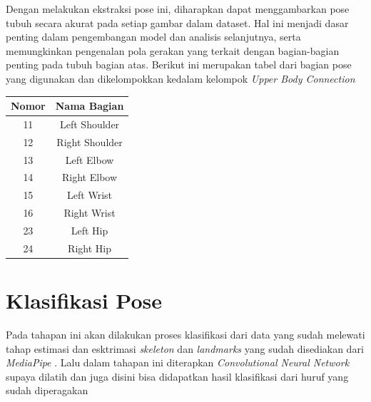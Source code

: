 Dengan melakukan ekstraksi pose ini, diharapkan dapat menggambarkan pose tubuh secara akurat pada setiap gambar dalam dataset. Hal ini menjadi dasar penting dalam pengembangan model dan analisis selanjutnya, serta memungkinkan pengenalan pola gerakan yang terkait dengan bagian-bagian penting pada tubuh bagian atas. Berikut ini merupakan tabel dari bagian pose yang digunakan dan dikelompokkan kedalam kelompok \textit{Upper Body Connection}
\begin{center}
	\begin{table}[hbt!]
		\label{tbl:PoseLandmarks}
		\centering
		\begin{tabular}{cc}
			\hline
			Nomor & Nama Bagian \\
			\hline
			
			11 & Left Shoulder \\
			\hline
			
			12 & Right Shoulder \\
			\hline
			
			13 & Left Elbow \\
			\hline
			
			14 & Right Elbow \\
			\hline
			
			15 & Left Wrist \\
			\hline
			
			16 & Right Wrist \\
			\hline
			
			23 & Left Hip \\
			\hline
			
			24 & Right Hip \\
			\hline
		\end{tabular}
	\end{table}
	\end{center}
\section{Klasifikasi Pose}
Pada tahapan ini akan dilakukan proses klasifikasi dari data yang sudah melewati tahap estimasi dan esktrimasi \textit{skeleton} dan \textit{landmarks} yang sudah disediakan dari \textit{\textit{MediaPipe}} . Lalu dalam tahapan ini  diterapkan \textit{Convolutional Neural Network} supaya dilatih dan juga disini bisa didapatkan hasil klasifikasi dari huruf yang sudah diperagakan

